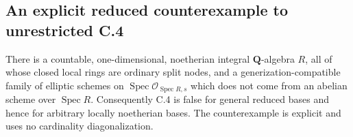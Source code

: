 \subsection{An explicit reduced counterexample to unrestricted C.4}

\begin{theorem}
\label{thm:C-RD10}
There is a countable, one-dimensional, noetherian integral
$\mathbf Q$-algebra $R$, all of whose closed local rings are ordinary
split nodes, and a generization-compatible family of elliptic schemes
on $\operatorname{Spec}\mathcal O_{\operatorname{Spec}R,s}$ which does
not come from an abelian scheme over $\operatorname{Spec}R$.
Consequently C.4 is false for general reduced bases and hence for
arbitrary locally noetherian bases. The counterexample is explicit
and uses no cardinality diagonalization.
\end{theorem}
